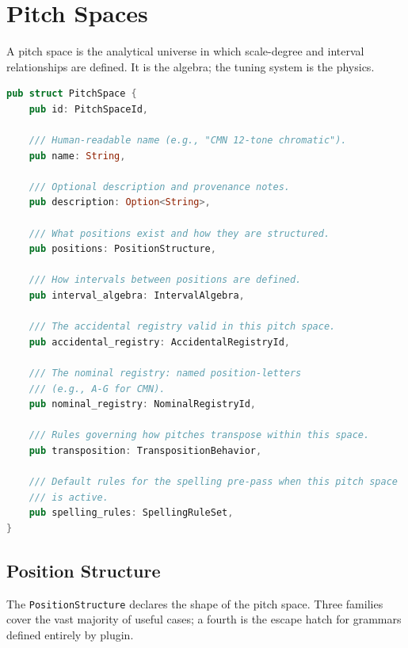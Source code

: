 \documentclass[11pt,letterpaper]{report}
\begin{document}
\section{Pitch Spaces}
\label{sec:tuning:space}

A pitch space is the analytical universe in which scale-degree and
interval relationships are defined. It is the algebra; the tuning
system is the physics.

\begin{lstlisting}[language=Rust]
pub struct PitchSpace {
    pub id: PitchSpaceId,

    /// Human-readable name (e.g., "CMN 12-tone chromatic").
    pub name: String,

    /// Optional description and provenance notes.
    pub description: Option<String>,

    /// What positions exist and how they are structured.
    pub positions: PositionStructure,

    /// How intervals between positions are defined.
    pub interval_algebra: IntervalAlgebra,

    /// The accidental registry valid in this pitch space.
    pub accidental_registry: AccidentalRegistryId,

    /// The nominal registry: named position-letters
    /// (e.g., A-G for CMN).
    pub nominal_registry: NominalRegistryId,

    /// Rules governing how pitches transpose within this space.
    pub transposition: TranspositionBehavior,

    /// Default rules for the spelling pre-pass when this pitch space
    /// is active.
    pub spelling_rules: SpellingRuleSet,
}
\end{lstlisting}

\subsection{Position Structure}
\label{sec:tuning:positions}

The \texttt{PositionStructure} declares the shape of the pitch space.
Three families cover the vast majority of useful cases; a fourth is the
escape hatch for grammars defined entirely by plugin.
\end{document}
